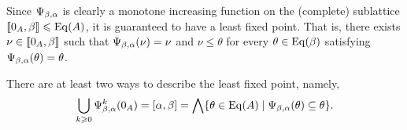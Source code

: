 \begin{remark}
  Since $\Psi_{\beta, \alpha}$ is clearly a monotone increasing function on the (complete) sublattice
  $\llbracket 0_A, \beta\rrbracket \leqslant \operatorname{Eq}(A)$, it is guaranteed to have a least fixed point.
  That is, there exists $\nu\in \llbracket 0_A, \beta\rrbracket$ such that $\Psi_{\beta, \alpha}(\nu) = \nu$
  and $\nu \leq \theta$ for every $\theta\in \operatorname{Eq}(\beta)$
  satisfying $\Psi_{\beta, \alpha}(\theta) = \theta$.

  There are at least two ways to describe the least fixed point, namely,
  \[\bigcup_{k\geqslant 0} \Psi_{\beta, \alpha}^{k}(0_A) = [\alpha, \beta]  
  = \bigwedge \{ \theta \in \operatorname{Eq}(A) \mid \Psi_{\beta, \alpha}(\theta) \subseteq \theta\}.\]

\end{remark}







